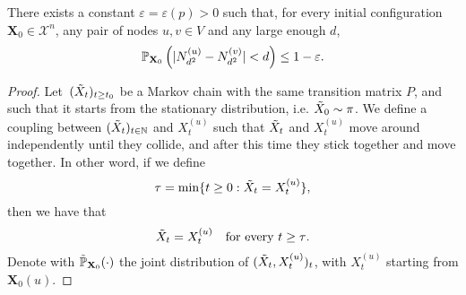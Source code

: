 \documentclass{article}
\newcommand{\inote}[1]{{\color{blue} ({\bf Isa:} #1)}}
\begin{document}
\begin{lemma} \label{lemma:one_step_deviation}
There exists a constant $\varepsilon=\varepsilon(p)>0$ such that, for every initial configuration $\mathbf{X}_0 \in \mathcal{X}^{n}$, any pair of nodes $u,v \in V$ and any large enough $d$,
    \begin{equation*}
        \operatorname{\mathbb{P}}_{\mathbf{X}_0} \left(  |N^{(u)}_{d^2} - N^{(v)}_{d^2}| <  d \right) \leq 1-\varepsilon.
    \end{equation*}
\end{lemma}
\begin{proof}
    Let~$(\Tilde{X}_t)_{t \geq t_0}$ be a Markov chain with the same transition matrix $P$, and such that it starts from the stationary distribution, i.e. $\Tilde{X}_0 \sim \pi$. 
    We define a coupling between $(\Tilde{X}_t)_{t \in \mathbb{N}}$ and $X_t^{(u)}$ such that $\Tilde{X}_t$ and $X_t^{(u)}$ move around independently until they collide, and after this time they stick together and move together. In other word, if we define
    \[\tau = \min\{t \geq 0: \Tilde{X}_t = X_t^{(u)}\},\]
    then we have that
    \[\Tilde{X}_t = X_t^{(u)} \quad \text{for every $t \geq \tau$.}\]
    Denote with $\Tilde{\operatorname{\mathbb{P}}}_{\mathbf{X}_0}(\cdot)$ the joint distribution of $(\Tilde{X}_t, X_t^{(u)})_t$, with $X_t^{(u)}$ starting from $\mathbf{X}_0(u)$.

    
    

\end{proof}
\end{document}
